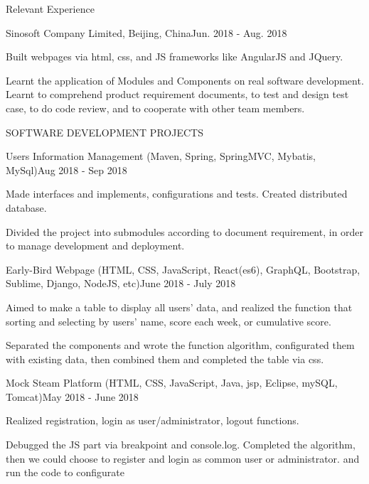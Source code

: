 \documentclass{resume} %
\begin{document}
\begin{rSection}{Relevant Experience}

\begin{rSubsection}{Sinosoft Company Limited, Beijing, China}{Jun. 2018 - Aug. 2018}{}{}
\item Built webpages via html, css, and JS frameworks like AngularJS and JQuery.  
\item Learnt the application of Modules and Components on real software development. Learnt to comprehend product requirement documents, to test and design test case, to do code review, and to cooperate with other team members.
\end{rSubsection}

\end{rSection}




\begin{rSection}{SOFTWARE DEVELOPMENT PROJECTS}
\begin{rSubsection}{Users Information Management (Maven, Spring, SpringMVC, Mybatis, MySql)}{Aug 2018 - Sep 2018}{}{}
\item Made interfaces and implements, configurations and tests. Created distributed database.
\item Divided the project into submodules according to document requirement, in order to manage development and deployment. 
\end{rSubsection}
\begin{rSubsection}{Early-Bird Webpage (HTML, CSS, JavaScript, React(es6), GraphQL, Bootstrap, Sublime, Django, NodeJS, etc)}{June 2018 - July 2018}{}{}
\item Aimed to make a table to display all users' data, and realized the function that sorting and selecting by users' name, score each week, or cumulative score.
\item Separated the components and wrote the function algorithm, configurated them with existing data, then combined them and completed the table via css.
\end{rSubsection}



\begin{rSubsection}{Mock Steam Platform (HTML, CSS, JavaScript, Java, jsp, Eclipse, mySQL, Tomcat)}{May 2018 - June 2018}{}{}
\item Realized registration, login as user/administrator, logout functions.
\item Debugged the JS part via breakpoint and console.log. Completed the algorithm, then we could choose to register and login as common user or administrator.
and run the code to configurate 
\end{rSubsection}

\end{rSection}
\end{document}
